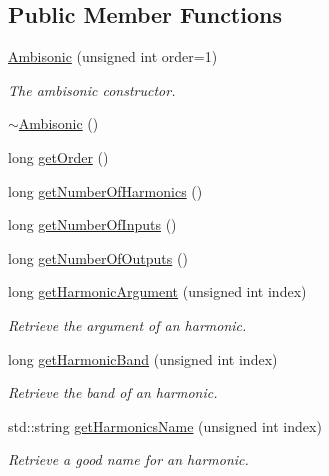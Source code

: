 \subsection*{Public Member Functions}
\begin{DoxyCompactItemize}
\item 
\hyperlink{class_hoa3_d_1_1_ambisonic_aedbcac4a5b11cec6738e1047ecee7e7b}{Ambisonic} (unsigned int order=1)
\begin{DoxyCompactList}\small\item\em The ambisonic constructor. \end{DoxyCompactList}\item 
\hyperlink{class_hoa3_d_1_1_ambisonic_a082fc2e3f9910703ddb49b9a478329bf}{$\sim$\-Ambisonic} ()
\item 
long \hyperlink{class_hoa3_d_1_1_ambisonic_a677405a1c3aa359753bd675d4614e7da}{get\-Order} ()
\item 
long \hyperlink{class_hoa3_d_1_1_ambisonic_aa9d613f38e6876326201995a5a415410}{get\-Number\-Of\-Harmonics} ()
\item 
long \hyperlink{class_hoa3_d_1_1_ambisonic_af03625afb9f21ef3574eafa8501129b4}{get\-Number\-Of\-Inputs} ()
\item 
long \hyperlink{class_hoa3_d_1_1_ambisonic_a126ed3be1aa3d155f56ca75ca3d69de5}{get\-Number\-Of\-Outputs} ()
\item 
long \hyperlink{class_hoa3_d_1_1_ambisonic_a3acaabfd013671c94e057e23eea1d068}{get\-Harmonic\-Argument} (unsigned int index)
\begin{DoxyCompactList}\small\item\em Retrieve the argument of an harmonic. \end{DoxyCompactList}\item 
long \hyperlink{class_hoa3_d_1_1_ambisonic_a06ecceb7aef44cd7008fd8beaf8cf33e}{get\-Harmonic\-Band} (unsigned int index)
\begin{DoxyCompactList}\small\item\em Retrieve the band of an harmonic. \end{DoxyCompactList}\item 
std\-::string \hyperlink{class_hoa3_d_1_1_ambisonic_a1b4578538f4fd0d311102b2f3ec4dac6}{get\-Harmonics\-Name} (unsigned int index)
\begin{DoxyCompactList}\small\item\em Retrieve a good name for an harmonic. \end{DoxyCompactList}\end{DoxyCompactItemize}


